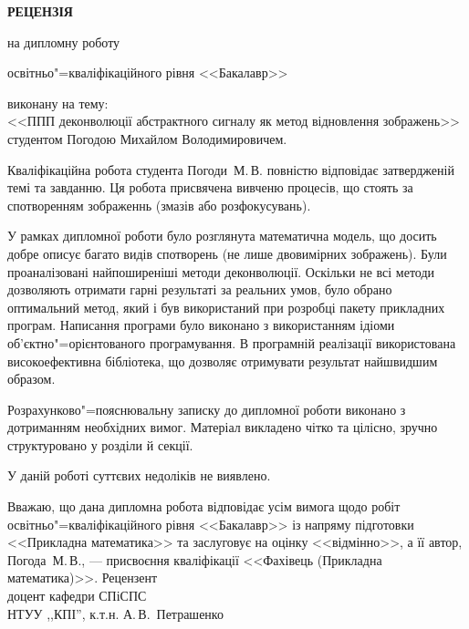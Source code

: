 \documentclass[12pt]{article}
\begin{document}
\renewcommand{\baselinestretch}{1.5}\thispagestyle{empty}

\begin{center}
  \bfseries
  {\Large РЕЦЕНЗІЯ}

  \large
  на дипломну роботу

  освітньо"=кваліфікаційного рівня <<Бакалавр>>
\end{center}
\renewcommand{\baselinestretch}{1.2}\thispagestyle{empty}
\large
виконану на тему:\\
<<ППП деконволюції абстрактного сигналу як метод відновлення зображень>>
студентом Погодою Михайлом Володимировичем.

Кваліфікаційна робота студента Погоди~М.\,В. повністю відповідає затвердженій
темі та завданню.
Ця робота присвячена вивченю процесів, що стоять за спотворенням зображеннь
(змазів або розфокусувань).

У рамках дипломної роботи було розглянута математична модель, що досить добре
описує багато видів спотворень (не лише двовимірних зображень).
Були проаналізовані найпоширеніші методи деконволюції.
Оскільки не всі методи дозволяють отримати гарні результаті за реальних умов,
було обрано оптимальний метод, який і був використаний при розробці пакету
прикладних програм.
Написання програми було виконано з використанням ідіоми
об’єктно"=орієнтованого програмування.
В програмній реалізації використована високоефективна бібліотека, що дозволяє
отримувати результат найшвидшим образом.

Розрахунково"=пояснювальну записку до дипломної роботи виконано з дотриманням
необхідних вимог.
Матеріал викладено чітко та цілісно, зручно структуровано у розділи й секції.

У даній роботі суттєвих недоліків не виявлено.

Вважаю, що дана дипломна робота відповідає усім вимога щодо робіт
освітньо"=кваліфікаційного рівня <<Бакалавр>> із напряму підготовки
<<Прикладна математика>> та заслуговує на оцінку <<відмінно>>, а її автор,
Погода~М.\,В., --- присвоєння кваліфікації <<Фахівець (Прикладна
математика)>>.
\vfill
Рецензент\\
доцент кафедри СПіСПС\\\indent НТУУ ,,КПІ'', к.т.н.\hfill\hfill\underline{\hspace{3cm}}\hfill
А.\,В.~Петрашенко
\end{document}
